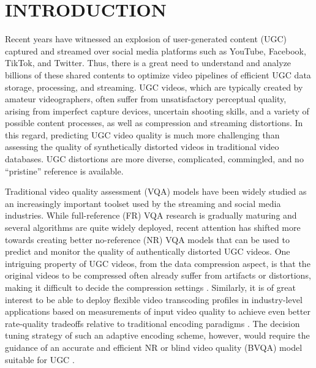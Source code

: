 \documentclass[transmag]{IEEEtran}
\begin{document}
\maketitle

\section{INTRODUCTION}
\label{sec:introduction}

Recent years have witnessed an explosion of user-generated content (UGC) captured and streamed over social media platforms such as YouTube, Facebook, TikTok, and Twitter. Thus, there is a great need to understand and analyze billions of these shared contents to optimize video pipelines of efficient UGC data storage, processing, and streaming. UGC videos, which are typically created by amateur videographers, often suffer from unsatisfactory perceptual quality, arising from imperfect capture devices, uncertain shooting skills, and a variety of possible content processes, as well as compression and streaming distortions. In this regard, predicting UGC video quality is much more challenging than assessing the quality of synthetically distorted videos in traditional video databases. UGC distortions are more diverse, complicated, commingled, and no ``pristine'' reference is available.

Traditional video quality assessment (VQA) models have been widely studied \cite{seshadrinathan2010study} as an increasingly important toolset used by the streaming and social media industries. While full-reference (FR) VQA research is gradually maturing and several algorithms \cite{wang2004image, li2016toward} are quite widely deployed, recent attention has shifted more towards creating better no-reference (NR) VQA models that can be used to predict and monitor the quality of authentically distorted UGC videos. One intriguing property of UGC videos, from the data compression aspect, is that the original videos to be compressed often already suffer from artifacts or distortions, making it difficult to decide the compression settings \cite{yu2020predicting}. Similarly, it is of great interest to be able to deploy flexible video transcoding profiles in industry-level applications based on measurements of input video quality to achieve even better rate-quality tradeoffs relative to traditional encoding paradigms \cite{Wang2020}. The decision tuning strategy of such an adaptive encoding scheme, however, would require the guidance of an accurate and efficient NR or blind video quality (BVQA) model suitable for UGC \cite{tu2020ugc}.
\end{document}
